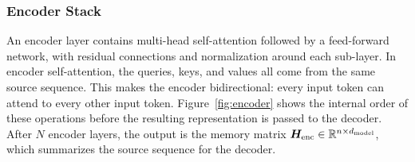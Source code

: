 \subsubsection{Encoder Stack}

An encoder layer contains multi-head self-attention followed by a feed-forward network, with residual connections and normalization around each sub-layer. In encoder self-attention, the queries, keys, and values all come from the same source sequence. This makes the encoder bidirectional: every input token can attend to every other input token. Figure~\ref{fig:encoder} shows the internal order of these operations before the resulting representation is passed to the decoder. After $N$ encoder layers, the output is the memory matrix $\bm{H}_{\text{enc}} \in \mathbb{R}^{n \times d_{\text{model}}}$, which summarizes the source sequence for the decoder.

